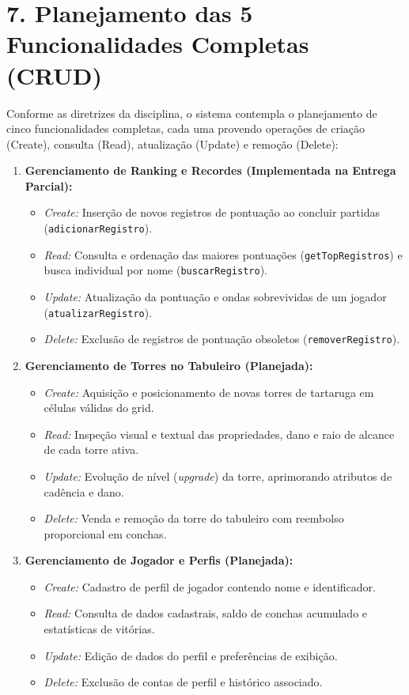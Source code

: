 \documentclass[11pt,a4paper]{article}
\begin{document}
\clearpage
\section*{7. Planejamento das 5 Funcionalidades Completas (CRUD)}
Conforme as diretrizes da disciplina, o sistema contempla o planejamento de cinco funcionalidades completas, cada uma provendo operações de criação (Create), consulta (Read), atualização (Update) e remoção (Delete):

\begin{enumerate}
    \item \textbf{Gerenciamento de Ranking e Recordes (Implementada na Entrega Parcial):}
    \begin{itemize}
        \item \textit{Create:} Inserção de novos registros de pontuação ao concluir partidas (\texttt{adicionarRegistro}).
        \item \textit{Read:} Consulta e ordenação das maiores pontuações (\texttt{getTopRegistros}) e busca individual por nome (\texttt{buscarRegistro}).
        \item \textit{Update:} Atualização da pontuação e ondas sobrevividas de um jogador (\texttt{atualizarRegistro}).
        \item \textit{Delete:} Exclusão de registros de pontuação obsoletos (\texttt{removerRegistro}).
    \end{itemize}

    \item \textbf{Gerenciamento de Torres no Tabuleiro (Planejada):}
    \begin{itemize}
        \item \textit{Create:} Aquisição e posicionamento de novas torres de tartaruga em células válidas do grid.
        \item \textit{Read:} Inspeção visual e textual das propriedades, dano e raio de alcance de cada torre ativa.
        \item \textit{Update:} Evolução de nível (\textit{upgrade}) da torre, aprimorando atributos de cadência e dano.
        \item \textit{Delete:} Venda e remoção da torre do tabuleiro com reembolso proporcional em conchas.
    \end{itemize}

    \item \textbf{Gerenciamento de Jogador e Perfis (Planejada):}
    \begin{itemize}
        \item \textit{Create:} Cadastro de perfil de jogador contendo nome e identificador.
        \item \textit{Read:} Consulta de dados cadastrais, saldo de conchas acumulado e estatísticas de vitórias.
        \item \textit{Update:} Edição de dados do perfil e preferências de exibição.
        \item \textit{Delete:} Exclusão de contas de perfil e histórico associado.
    \end{itemize}


\end{enumerate}
\end{document}
